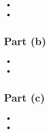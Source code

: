 \documentclass[a4paper,12pt]{article}
\begin{document}
\begin{itemize}
\item
\item
\end{itemize}



\subsection*{Part (b)}

\begin{itemize}
\item
\item
\end{itemize}




\subsection*{Part (c)}

\begin{itemize}
\item
\item
\end{itemize}

\end{document}
